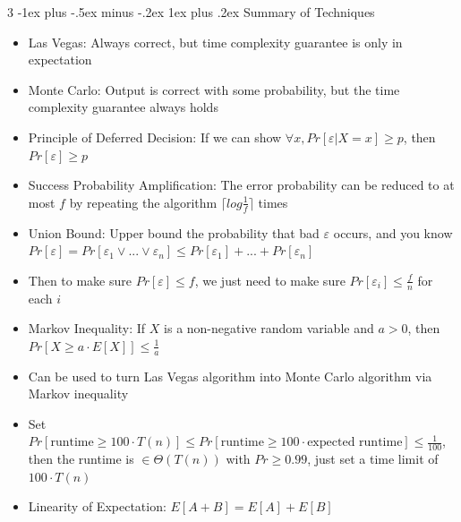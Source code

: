 \documentclass[10pt, landscape]{article}
\makeatletter
\renewcommand{\subsection}{\@startsection{subsection}{3}{0mm}%
                                {-1ex plus -.5ex minus -.2ex}%
                                {1ex plus .2ex}%
                                {\normalfont\small\bfseries}}%
\makeatother
\begin{document}
\begin{multicols*}{3}
\subsection{Summary of Techniques}
\begin{itemize}
    \item Las Vegas: Always correct, but time complexity guarantee is only in expectation
    \item Monte Carlo: Output is correct with some probability, but the time complexity guarantee always holds
    \item Principle of Deferred Decision: If we can show $\forall x , Pr[\varepsilon|X=x]\geq p$, then $Pr[\varepsilon]\geq p$
    \item Success Probability Amplification: The error probability can be reduced to at most $f$ by repeating the algorithm $\lceil log \frac{1}{f} \rceil$ times
    \item Union Bound: Upper bound the probability that bad $\varepsilon$ occurs, and you know $Pr[\varepsilon] =Pr[\varepsilon_1\lor ...\lor\varepsilon_n]\leq Pr[\varepsilon_1]+...+Pr[\varepsilon_n]$
    \item Then to make sure $Pr[\varepsilon]\leq f$, we just need to make sure $Pr[\varepsilon_i]\leq \frac{f}{n}$ for each $i$
    \item Markov Inequality: If $X$ is a non-negative random variable and $a>0$, then $Pr[X \geq a \cdot E[X]] \leq \frac{1}{a}$
    \item Can be used to turn Las Vegas algorithm into Monte Carlo algorithm via Markov inequality
    \item Set $Pr[\text{runtime} \geq 100 \cdot T(n)] \leq Pr[\text{runtime} \geq 100 \cdot \text{expected runtime}] \leq \frac{1}{100}$, then the runtime is $\in \Theta(T(n))$ with $Pr \geq 0.99$, just set a time limit of $100 \cdot T(n)$
    \item Linearity of Expectation: $E[A+B]=E[A]+E[B]$
\end{itemize}


\end{multicols*}
\end{document}
